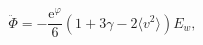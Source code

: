 \begin{equation}
\ddot\Phi
   = - \frac{\mathrm{e}^\varphi}{6}  
       \left( 1 + 3\gamma - 2\langle v^2 \rangle
       \right) E_w,
\end{equation}

